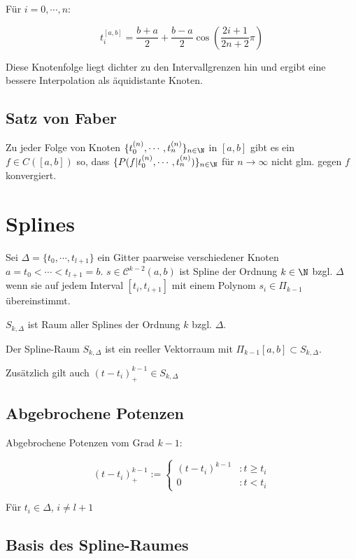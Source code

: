 Für $i = 0,\cdots,n$:

\vspace{-2mm}
$$t_i^{[a,b]} = \frac{b+a}{2} + \frac{b-a}{2} \cos\left(\frac{2i+1}{2n+2} \pi\right)$$

Diese Knotenfolge liegt dichter zu den Intervallgrenzen hin und ergibt eine bessere Interpolation als äquidistante Knoten.

\subsection*{Satz von Faber}

Zu jeder Folge von Knoten $\{t_0^{(n)},\cdots,t_n^{(n)}\}_{n \in \N}$ in $[a,b]$ gibt es ein $f \in C([a,b])$ so, dass $\{P(f|t_0^{(n)},\cdots,t_n^{(n)})\}_{n \in \N}$ für $n \to \infty$ nicht glm. gegen $f$ konvergiert.

\section*{Splines}

Sei $\Delta = \{t_0,\cdots,t_{l+1}\}$ ein Gitter paarweise verschiedener Knoten $a=t_0 < \cdots < t_{l+1} = b$.
$s \in \mathcal{C}^{k-2}(a,b)$ ist Spline der Ordnung $k \in \N$ bzgl. $\Delta$ wenn sie auf jedem Interval $[t_i,t_{i+1}]$ mit einem Polynom $s_i \in \Pi_{k-1}$ übereinstimmt.

$S_{k,\Delta}$ ist Raum aller Splines der Ordnung $k$ bzgl. $\Delta$.

Der Spline-Raum $S_{k,\Delta}$ ist ein reeller Vektorraum mit $\Pi_{k-1}[a,b] \subset S_{k,\Delta}$.

Zusätzlich gilt auch $(t-t_i)_+^{k-1} \in S_{k,\Delta}$

\subsection*{Abgebrochene Potenzen}

Abgebrochene Potenzen vom Grad $k-1$:

$$(t-t_i)_+^{k-1} := \begin{cases}(t-t_i)^{k-1} &: t \geq t_i \\ 0 &: t < t_i\end{cases}$$

Für $t_i \in \Delta$, $i \neq l+1$

\subsection*{Basis des Spline-Raumes}

